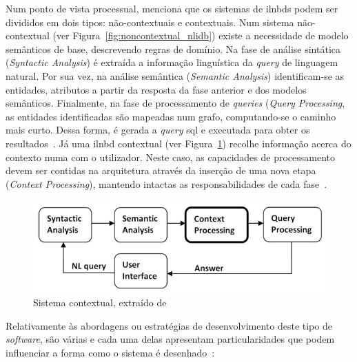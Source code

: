 Num ponto de vista processual, \textcite{novel_approach_towards_incorporating_context_processing_nlidb} menciona que os sistemas de \glspl{ilnbd} podem ser divididos em dois tipos: não-contextuais e contextuais. Num sistema não-contextual (ver Figura~\ref{fig:noncontextual_nlidb}) existe a necessidade de modelo semânticos de base, descrevendo regras de domínio. Na fase de análise sintática (\textit{Syntactic Analysis}) é extraída a informação linguística da \textit{query} de linguagem natural. Por sua vez, na análise semântica (\textit{Semantic Analysis}) identificam-se as entidades, atributos a partir da resposta da fase anterior e dos modelos semânticos. Finalmente, na fase de processamento de \textit{queries} (\textit{Query Processing}, as entidades identificadas são mapeadas num grafo, computando-se o caminho mais curto. Dessa forma, é gerada a \textit{query} \gls{sql} e executada para obter os resultados~\parencite{novel_approach_towards_incorporating_context_processing_nlidb}. Já uma \gls{ilnbd} contextual (ver Figura~\ref{fig:contextual_nlidb}) recolhe informação acerca do contexto numa  com o utilizador. Neste caso, as capacidades de processamento devem ser contidas na arquitetura através da inserção de uma nova etapa (\textit{Context Processing}), mantendo intactas as responsabilidades de cada fase~\parencite{novel_approach_towards_incorporating_context_processing_nlidb}.
%
\begin{figure}
    \centering
    \includegraphics[width=.8\textwidth]{ch03/assets/contextual_nlidb.jpg}
    \caption{Sistema contextual, extraído de~\textcite{novel_approach_towards_incorporating_context_processing_nlidb}}
    \label{fig:contextual_nlidb}
\end{figure}
%
Relativamente às abordagens ou estratégias de desenvolvimento deste tipo de \textit{software}, são várias e cada uma delas apresentam particularidades que podem influenciar a forma como o sistema é desenhado~\parencite{nlidb_brief_review, survey_nlidb}:

